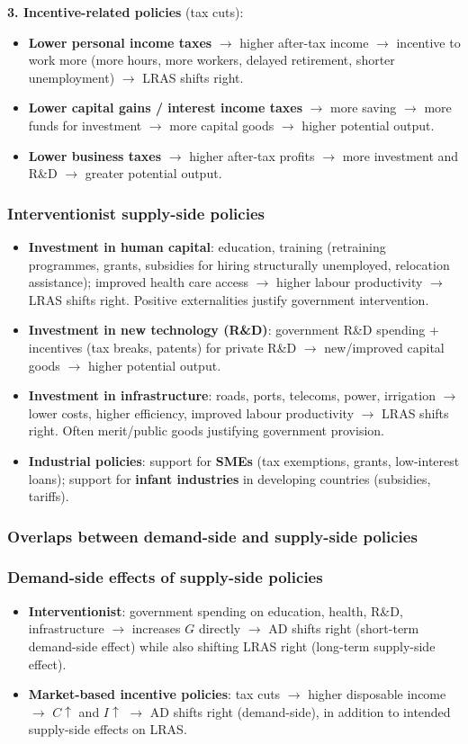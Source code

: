 \textbf{3. Incentive-related policies} (tax cuts):
\begin{itemize}
  \item \textbf{Lower personal income taxes} $\to$ higher after-tax income $\to$ incentive to work more (more hours, more workers, delayed retirement, shorter unemployment) $\to$ LRAS shifts right.
  \item \textbf{Lower capital gains / interest income taxes} $\to$ more saving $\to$ more funds for investment $\to$ more capital goods $\to$ higher potential output.
  \item \textbf{Lower business taxes} $\to$ higher after-tax profits $\to$ more investment and R\&D $\to$ greater potential output.
\end{itemize}
\subsubsection*{Interventionist supply-side policies}
\begin{itemize}
  \item \textbf{Investment in human capital}: education, training (retraining programmes, grants, subsidies for hiring structurally unemployed, relocation assistance); improved health care access $\to$ higher labour productivity $\to$ LRAS shifts right. Positive externalities justify government intervention.
  \item \textbf{Investment in new technology (R\&D)}: government R\&D spending + incentives (tax breaks, patents) for private R\&D $\to$ new/improved capital goods $\to$ higher potential output.
  \item \textbf{Investment in infrastructure}: roads, ports, telecoms, power, irrigation $\to$ lower costs, higher efficiency, improved labour productivity $\to$ LRAS shifts right. Often merit/public goods justifying government provision.
  \item \textbf{Industrial policies}: support for \textbf{SMEs} (tax exemptions, grants, low-interest loans); support for \textbf{infant industries} in developing countries (subsidies, tariffs).
\end{itemize}
\subsubsection*{Overlaps between demand-side and supply-side policies}

\subsubsection*{Demand-side effects of supply-side policies}
\begin{itemize}
  \item \textbf{Interventionist}: government spending on education, health, R\&D, infrastructure $\to$ increases $G$ directly $\to$ AD shifts right (short-term demand-side effect) while also shifting LRAS right (long-term supply-side effect).
  \item \textbf{Market-based incentive policies}: tax cuts $\to$ higher disposable income $\to$ $C \uparrow$ and $I \uparrow$ $\to$ AD shifts right (demand-side), in addition to intended supply-side effects on LRAS.
\end{itemize}

